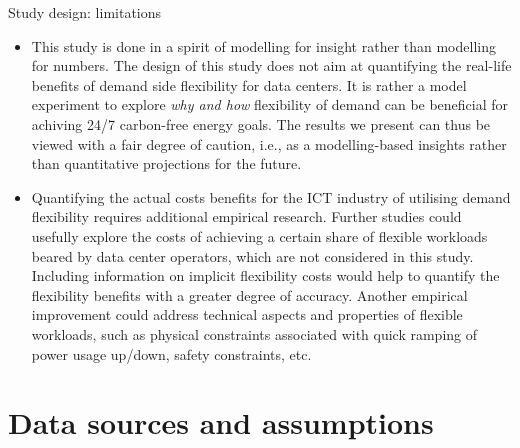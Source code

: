 \begin{frame}{Study design: limitations}
  
  {\footnotesize 
  \begin{itemize}

  \item This study is done in a spirit of \alert{modelling for insight} rather than \alert{modelling for numbers}. The design of this study does not aim at quantifying the real-life benefits of demand side flexibility for data centers. It is rather a model experiment to explore \textit{why and how} flexibility of demand can be beneficial for achiving 24/7 carbon-free energy goals. The results we present can thus be viewed with a fair degree of caution, i.e., as a modelling-based insights rather than quantitative projections for the future. 
  
  \item Quantifying the actual costs benefits for the ICT industry of utilising demand flexibility requires \alert{additional empirical research}. Further studies could usefully explore the costs of achieving a certain share of flexible workloads beared by data center operators, which are not considered in this study. Including information on implicit flexibility costs would help to quantify the flexibility benefits with a greater degree of accuracy. Another empirical improvement could address technical aspects and properties of flexible workloads, such as physical constraints associated with quick ramping of power usage up/down, safety constraints, etc.
  
  \end{itemize}
  }
  \end{frame}


\section{Data sources and assumptions}



